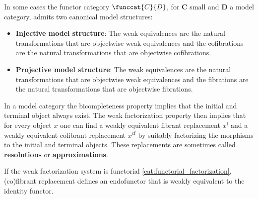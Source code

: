 

    \begin{example}\label{model:model_functor_category}
        In some cases the functor category $\funccat{C}{D}$, for $\mathbf{C}$ small and $\mathbf{D}$ a model category, admits two canonical model structures:
        \begin{itemize}
            \item\textbf{Injective model structure}: The weak equivalences are the natural transformations that are objectwise weak equivalences and the cofibrations are the natural transformations that are objectwise cofibrations.
            \item\textbf{Projective model structure}: The weak equivalences are the natural transformations that are objectwise weak equivalences and the fibrations are the natural transformations that are objectwise fibrations.
        \end{itemize}
    \end{example}

    \begin{property}[Resolution]
        In a model category the bicompleteness property implies that the initial and terminal object always exist. The weak factorization property then implies that for every object $x$ one can find a weakly equivalent fibrant replacement $x^\mathrm{f}$ and a weakly equivalent cofibrant replacement $x^\mathrm{cf}$ by suitably factorizing the morphisms to the initial and terminal objects. These replacements are sometimes called \textbf{resolutions} or \textbf{approximations}.

        If the weak factorization system is functorial \ref{cat:functorial_factorization}, (co)fibrant replacement defines an endofunctor that is weakly equivalent to the identity functor.
    \end{property}

